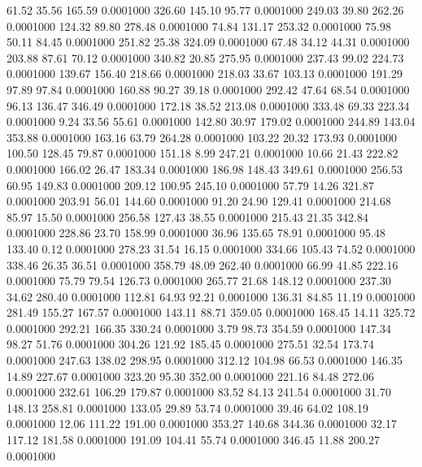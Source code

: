   61.52   35.56  165.59   0.0001000
 326.60  145.10   95.77   0.0001000
 249.03   39.80  262.26   0.0001000
 124.32   89.80  278.48   0.0001000
  74.84  131.17  253.32   0.0001000
  75.98   50.11   84.45   0.0001000
 251.82   25.38  324.09   0.0001000
  67.48   34.12   44.31   0.0001000
 203.88   87.61   70.12   0.0001000
 340.82   20.85  275.95   0.0001000
 237.43   99.02  224.73   0.0001000
 139.67  156.40  218.66   0.0001000
 218.03   33.67  103.13   0.0001000
 191.29   97.89   97.84   0.0001000
 160.88   90.27   39.18   0.0001000
 292.42   47.64   68.54   0.0001000
  96.13  136.47  346.49   0.0001000
 172.18   38.52  213.08   0.0001000
 333.48   69.33  223.34   0.0001000
   9.24   33.56   55.61   0.0001000
 142.80   30.97  179.02   0.0001000
 244.89  143.04  353.88   0.0001000
 163.16   63.79  264.28   0.0001000
 103.22   20.32  173.93   0.0001000
 100.50  128.45   79.87   0.0001000
 151.18    8.99  247.21   0.0001000
  10.66   21.43  222.82   0.0001000
 166.02   26.47  183.34   0.0001000
 186.98  148.43  349.61   0.0001000
 256.53   60.95  149.83   0.0001000
 209.12  100.95  245.10   0.0001000
  57.79   14.26  321.87   0.0001000
 203.91   56.01  144.60   0.0001000
  91.20   24.90  129.41   0.0001000
 214.68   85.97   15.50   0.0001000
 256.58  127.43   38.55   0.0001000
 215.43   21.35  342.84   0.0001000
 228.86   23.70  158.99   0.0001000
  36.96  135.65   78.91   0.0001000
  95.48  133.40    0.12   0.0001000
 278.23   31.54   16.15   0.0001000
 334.66  105.43   74.52   0.0001000
 338.46   26.35   36.51   0.0001000
 358.79   48.09  262.40   0.0001000
  66.99   41.85  222.16   0.0001000
  75.79   79.54  126.73   0.0001000
 265.77   21.68  148.12   0.0001000
 237.30   34.62  280.40   0.0001000
 112.81   64.93   92.21   0.0001000
 136.31   84.85   11.19   0.0001000
 281.49  155.27  167.57   0.0001000
 143.11   88.71  359.05   0.0001000
 168.45   14.11  325.72   0.0001000
 292.21  166.35  330.24   0.0001000
   3.79   98.73  354.59   0.0001000
 147.34   98.27   51.76   0.0001000
 304.26  121.92  185.45   0.0001000
 275.51   32.54  173.74   0.0001000
 247.63  138.02  298.95   0.0001000
 312.12  104.98   66.53   0.0001000
 146.35   14.89  227.67   0.0001000
 323.20   95.30  352.00   0.0001000
 221.16   84.48  272.06   0.0001000
 232.61  106.29  179.87   0.0001000
  83.52   84.13  241.54   0.0001000
  31.70  148.13  258.81   0.0001000
 133.05   29.89   53.74   0.0001000
  39.46   64.02  108.19   0.0001000
  12.06  111.22  191.00   0.0001000
 353.27  140.68  344.36   0.0001000
  32.17  117.12  181.58   0.0001000
 191.09  104.41   55.74   0.0001000
 346.45   11.88  200.27   0.0001000
